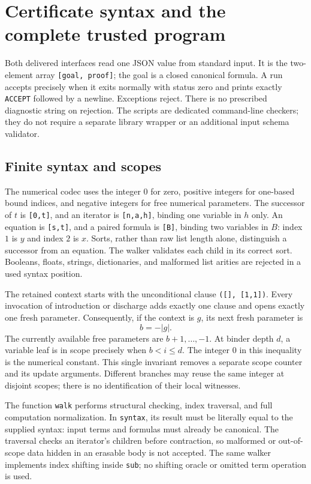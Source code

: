 \section{Certificate syntax and the complete trusted program}
\label{sec:implementation}

Both delivered interfaces read one JSON value from standard input. It is
the two-element array \texttt{[goal, proof]}; the goal is a closed canonical
formula. A run accepts precisely when it exits normally with status zero
and prints exactly \texttt{ACCEPT} followed by a newline. Exceptions reject.
There is no prescribed diagnostic string on rejection. The scripts are
dedicated command-line checkers; they do not require a separate library
wrapper or an additional input schema validator.

\subsection{Finite syntax and scopes}

The numerical codec uses the integer $0$ for zero, positive integers for
one-based bound indices, and negative integers for free numerical parameters.
The successor of $t$ is \texttt{[0,t]}, and an iterator is
\texttt{[n,a,h]}, binding one variable in $h$ only. An equation is
\texttt{[s,t]}, and a paired formula is \texttt{[B]}, binding two variables
in $B$: index $1$ is $y$ and index $2$ is $x$. Sorts, rather than raw list
length alone, distinguish a successor from an equation. The walker validates
each child in its correct sort. Booleans, floats, strings, dictionaries,
and malformed list arities are rejected in a used syntax position.

The retained context starts with the unconditional clause
\texttt{([], [1,1])}. Every invocation of introduction or discharge adds
exactly one clause and opens exactly one fresh parameter. Consequently,
if the context is $g$, its next fresh parameter is
\[
                 b=-|g|.
\]
The currently available free parameters are $b+1,\ldots,-1$.
At binder depth $d$, a variable leaf is in scope precisely when
$b<i\le d$. The integer $0$ in this inequality is the numerical constant.
This single invariant removes a separate scope counter and its update
arguments. Different branches may reuse the same integer at disjoint scopes;
there is no identification of their local witnesses.

The function \texttt{walk} performs structural checking, index traversal,
and full computation normalization. In \texttt{syntax}, its result must be
literally equal to the supplied syntax: input terms and formulas must already
be canonical. The traversal checks an iterator's children before contraction,
so malformed or out-of-scope data hidden in an erasable body is not accepted.
The same walker implements index shifting inside \texttt{sub}; no shifting
oracle or omitted term operation is used.

